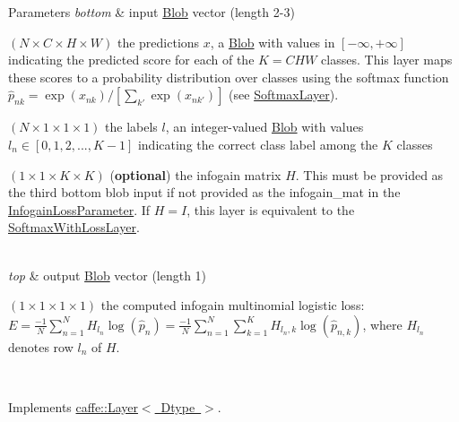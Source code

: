 \begin{DoxyParams}{Parameters}
{\em bottom} & input \mbox{\hyperlink{classcaffe_1_1_blob}{Blob}} vector (length 2-\/3)
\begin{DoxyEnumerate}
\item $ (N \times C \times H \times W) $ the predictions $ x $, a \mbox{\hyperlink{classcaffe_1_1_blob}{Blob}} with values in $ [-\infty, +\infty] $ indicating the predicted score for each of the $ K = CHW $ classes. This layer maps these scores to a probability distribution over classes using the softmax function $ \hat{p}_{nk} = \exp(x_{nk}) / \left[\sum_{k'} \exp(x_{nk'})\right] $ (see \mbox{\hyperlink{classcaffe_1_1_softmax_layer}{Softmax\+Layer}}).
\item $ (N \times 1 \times 1 \times 1) $ the labels $ l $, an integer-\/valued \mbox{\hyperlink{classcaffe_1_1_blob}{Blob}} with values $ l_n \in [0, 1, 2, ..., K - 1] $ indicating the correct class label among the $ K $ classes
\item $ (1 \times 1 \times K \times K) $ ({\bfseries optional}) the infogain matrix $ H $. This must be provided as the third bottom blob input if not provided as the infogain\+\_\+mat in the \mbox{\hyperlink{classcaffe_1_1_infogain_loss_parameter}{Infogain\+Loss\+Parameter}}. If $ H = I $, this layer is equivalent to the \mbox{\hyperlink{classcaffe_1_1_softmax_with_loss_layer}{Softmax\+With\+Loss\+Layer}}. 
\end{DoxyEnumerate}\\
\hline
{\em top} & output \mbox{\hyperlink{classcaffe_1_1_blob}{Blob}} vector (length 1)
\begin{DoxyEnumerate}
\item $ (1 \times 1 \times 1 \times 1) $ the computed infogain multinomial logistic loss\+: $ E = \frac{-1}{N} \sum\limits_{n=1}^N H_{l_n} \log(\hat{p}_n) = \frac{-1}{N} \sum\limits_{n=1}^N \sum\limits_{k=1}^{K} H_{l_n,k} \log(\hat{p}_{n,k}) $, where $ H_{l_n} $ denotes row $l_n$ of $H$. 
\end{DoxyEnumerate}\\
\hline
\end{DoxyParams}


Implements \mbox{\hyperlink{classcaffe_1_1_layer_a576ac6a60b1e99fe383831f52a6cea77}{caffe\+::\+Layer$<$ Dtype $>$}}.

\mbox{\label{classcaffe_1_1_infogain_loss_layer_a0e5e9667b19fb88ece7298e3e83d2fdb}} 

